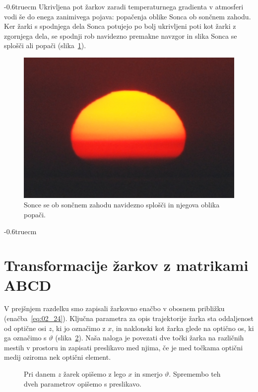\vglue-0.6truecm
Ukrivljena pot žarkov zaradi temperaturnega gradienta v atmosferi
vodi še do enega zanimivega pojava: popačenja oblike Sonca ob sončnem 
zahodu. Ker žarki s spodnjega dela Sonca potujejo po bolj ukrivljeni
poti kot žarki z zgornjega dela, se spodnji rob navidezno premakne navzgor 
in slika Sonca se splošči ali popači (slika~\ref{fig:02_Sonce}).
\begin{figure}[ht]
\centering
\includegraphics[width=5truecm]{slike/02_Sonce.jpg}
\caption{Sonce se ob sončnem zahodu navidezno splošči in njegova oblika popači.}
\label{fig:02_Sonce}
\end{figure}
\vglue-0.6truecm
\section{Transformacije žarkov z matrikami ABCD}
V prejšnjem razdelku smo zapisali žarkovno enačbo v obosnem 
približku (enačba~\ref{eq:02_24}). Ključna parametra za opis trajektorije žarka sta 
oddaljenost od optične osi $z$, ki jo označimo z $x$, in naklonski 
kot žarka glede na optično os, ki ga označimo s $\vartheta$ (slika~\ref{fig:01_ABCD0}).
Naša naloga je povezati dve točki žarka na različnih mestih v
prostoru in zapisati preslikavo med njima, če je med točkama
optični medij oziroma nek optični element. 
\begin{figure}[ht]
\centering
\def\svgwidth{90truemm} 

\caption{Pri danem $z$ žarek opišemo z lego $x$ in smerjo $\vartheta$. Spremembo
teh dveh parametrov opišemo s preslikavo.}
\label{fig:01_ABCD0}
\end{figure}

